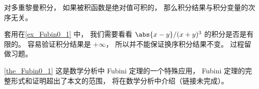 \begin{theorem}{}\label{the_Fubin0_1}
对多重黎曼积分， 如果被积函数是绝对值可积的， 那么积分结果与积分变量的次序无关。
\end{theorem}

套用在\autoref{ex_Fubin0_1} 中， 我们需要看看 $\abs{x-y}/(x+y)^3$ 的积分是否是有限的。 容易验证积分结果是 $+\infty$， 所以并不能保证换序积分结果不变。 过程留做习题。

\autoref{the_Fubin0_1} 这是数学分析中 Fubini 定理的一个特殊应用， Fubini 定理的完整形式和证明超出了本文的范围， 将在数学分析中介绍（链接未完成）。
